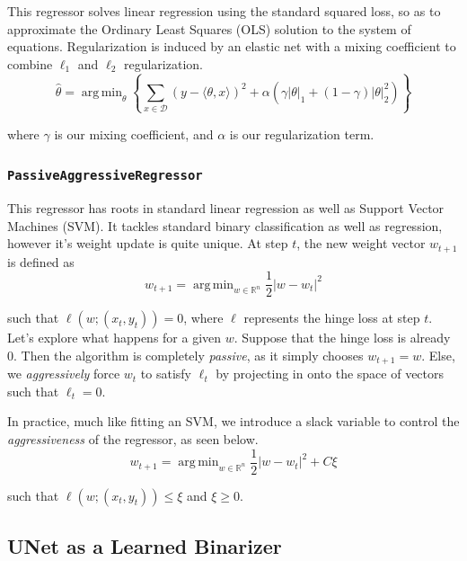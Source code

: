 \documentclass[paper=letter, fontsize=12pt]{article}
\numberwithin{equation}{section} %
\numberwithin{figure}{section} %
\numberwithin{table}{section} %
\newcommand{\abs}[1]{\left|#1\right|}
\DeclareMathOperator*{\argmin}{arg\,min}
\begin{document}
This regressor solves linear regression using the standard squared loss, so as
to approximate the Ordinary Least Squares (OLS) solution to the system of
equations.  Regularization is induced by an elastic net with a mixing
coefficient to combine $\ell_1$ and $\ell_2$ regularization.
\begin{equation*}
    \hat{\theta} = \argmin_\theta
        \left\{ \sum_{x \in \mathcal{D}} (y - \langle \theta, x \rangle)^2
                + \alpha\left(
                    \gamma\abs{\theta}_1 + (1 - \gamma)\abs{\theta}^2_2
                  \right)
        \right\}
\end{equation*}

where $\gamma$ is our mixing coefficient, and $\alpha$ is our regularization
term.

\subsubsection{\texttt{PassiveAggressiveRegressor}}

This regressor has roots in standard linear regression as well as Support
Vector Machines (SVM).\cite{paregression}  It tackles standard binary classification
as well as regression, however it's weight update is quite unique.  At step
$t$, the new weight vector $w_{t+1}$ is defined as
\begin{equation*}
    w_{t+1} = \argmin_{w \in \mathbb{R}^n} \frac{1}{2}\abs{w - w_t}^2
\end{equation*}

such that $\ell(w; (x_t, y_t)) = 0$, where $\ell$ represents the hinge loss at
step $t$.  Let's explore what happens for a given $w$.  Suppose that the hinge
loss is already 0.  Then the algorithm is completely \textit{passive}, as it
simply chooses $w_{t+1} = w$.  Else, we \textit{aggressively} force $w_t$
to satisfy $\ell_t$ by projecting in onto the space of vectors such that
$\ell_t = 0$.

In practice, much like fitting an SVM, we introduce a slack variable to control
the \textit{aggressiveness} of the regressor, as seen below.
\begin{equation*}
    w_{t+1} = \argmin_{w \in \mathbb{R}^n} \frac{1}{2}\abs{w - w_t}^2 + C\xi
\end{equation*}

such that $\ell(w; (x_t, y_t)) \le \xi$ and $\xi \ge 0$.

\subsection{UNet as a Learned Binarizer}
\end{document}
